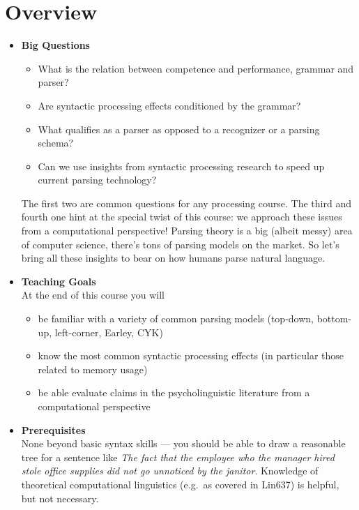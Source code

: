 \section{Overview}
\begin{itemize}
    \item \textbf{Big Questions}
        \begin{itemize}
            \item What is the relation between competence and performance, grammar and parser?
            \item Are syntactic processing effects conditioned by the grammar?
            \item What qualifies as a parser as opposed to a recognizer or a parsing schema?
            \item Can we use insights from syntactic processing research to speed up current parsing technology?
        \end{itemize}
        The first two are common questions for any processing course.
        The third and fourth one hint at the special twist of this course: we approach these issues from a computational perspective!
        Parsing theory is a big (albeit messy) area of computer science, there's tons of parsing models on the market.
        So let's bring all these insights to bear on how humans parse natural language.

    \item \textbf{Teaching Goals}\\
        At the end of this course you will 
        \begin{itemize}
            \item be familiar with a variety of common parsing models (top-down, bottom-up, left-corner, Earley, CYK)
            \item know the most common syntactic processing effects (in particular those related to memory usage)
            \item be able evaluate claims in the psycholinguistic literature from a computational perspective
        \end{itemize}

    \item \textbf{Prerequisites}\\
    None beyond basic syntax skills --- you should be able to draw a reasonable tree for a sentence like \emph{The fact that the employee who the manager hired stole office supplies did not go unnoticed by the janitor}.
    Knowledge of theoretical computational linguistics (e.g.\ as covered in Lin637) is helpful, but not necessary.
\end{itemize}

